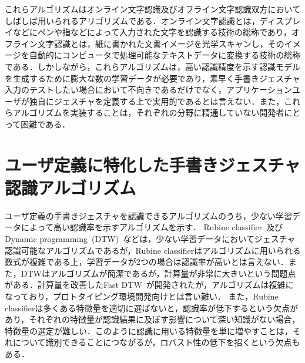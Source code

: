 これらアルゴリズムはオンライン文字認識及びオフライン文字認識双方においてしばしば用いられるアリゴリズムである．オンライン文字認識とは，ディスプレイなどにペンや指などによって入力された文字を認識する技術の総称であり，オフライン文字認識とは，紙に書かれた文書イメージを光学スキャンし，そのイメージを自動的にコンピュータで処理可能なテキストデータに変換する技術の総称である．しかしながら，これらアルゴリズムは，高い認識精度を示す認識モデルを生成するために膨大な数の学習データが必要であり，素早く手書きジェスチャ入力のテストしたい場合において不向きであるだけでなく，アプリケーションユーザが独自にジェスチャを定義する上で実用的であるとは言えない．また，これらアルゴリズムを実装することは，それぞれの分野に精通していない開発者にとって困難である．

\section{ユーザ定義に特化した手書きジェスチャ認識アルゴリズム}
ユーザ定義の手書きジェスチャを認識できるアルゴリズムのうち，少ない学習データによって高い認識率を示すアルゴリズムを示す．
Rubine classifier~\cite{Rubine:1991:SGE:122718.122753}及びDynamic programming~(DTW)~\cite{Tappert:1982:CSR:1664966.1664979}などは，少ない学習データにおいてジェスチャ認識可能なアルゴリズムであるが，Rubine classifierはアルゴリズムに用いられる数式が複雑である上，学習データが2つの場合は認識率が高いとは言えない．また，DTWはアルゴリズムが簡潔であるが，計算量が非常に大きいという問題点がある．計算量を改善したFast DTW~\cite{Salvador:2007:TAD:1367985.1367993}が開発されたが，アルゴリズムは複雑になっており，プロトタイピング環境開発向けとは言い難い．
また，Rubine classifierは多くある特徴量を適切に選ばないと，認識率が低下するという欠点があり，それぞれの特徴量が認識結果に及ぼす影響について深い知識がない場合，特徴量の選定が難しい．このように認識に用いる特徴量を単に増やすことは，それについて識別できることにつながるが，ロバスト性の低下を招くという欠点もある．

